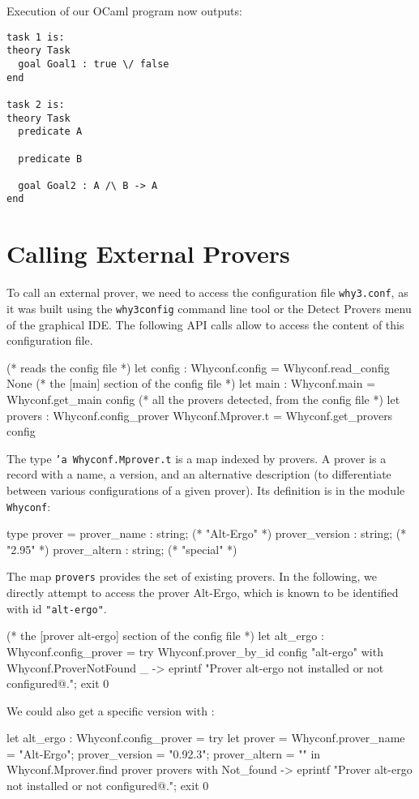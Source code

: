 Execution of our OCaml program now outputs:
\begin{verbatim}
task 1 is:
theory Task
  goal Goal1 : true \/ false
end

task 2 is:
theory Task
  predicate A

  predicate B

  goal Goal2 : A /\ B -> A
end
\end{verbatim}

\section{Calling External Provers}

To call an external prover, we need to access the \why configuration
file \texttt{why3.conf}, as it was built using the \texttt{why3config}
command line tool or the \textsf{Detect Provers} menu of the graphical
IDE. The following API calls allow to access the content of this
configuration file.
\begin{ocamlcode}
(* reads the config file *)
let config : Whyconf.config = Whyconf.read_config None
(* the [main] section of the config file *)
let main : Whyconf.main = Whyconf.get_main config
(* all the provers detected, from the config file *)
let provers : Whyconf.config_prover Whyconf.Mprover.t =
  Whyconf.get_provers config
\end{ocamlcode}
The type \texttt{'a Whyconf.Mprover.t} is a map indexed by provers. A
prover is a record with a name, a version, and an alternative description
(to differentiate between various configurations of a given prover). Its
definition is in the module \texttt{Whyconf}:
\begin{ocamlcode}
type prover =
    { prover_name : string; (* "Alt-Ergo" *)
      prover_version : string; (* "2.95" *)
      prover_altern : string; (* "special" *)
    }
\end{ocamlcode}
The map \texttt{provers} provides the set of existing provers.
In the following, we directly
attempt to access the prover Alt-Ergo, which is known to be identified
with id \texttt{"alt-ergo"}.
\begin{ocamlcode}
(* the [prover alt-ergo] section of the config file *)
let alt_ergo : Whyconf.config_prover =
  try
    Whyconf.prover_by_id config "alt-ergo"
  with Whyconf.ProverNotFound _ ->
    eprintf "Prover alt-ergo not installed or not configured@.";
    exit 0
\end{ocamlcode}
We could also get a specific version with :
\begin{ocamlcode}
let alt_ergo : Whyconf.config_prover =
  try
    let prover = {Whyconf.prover_name = "Alt-Ergo";
                  prover_version = "0.92.3";
                  prover_altern = ""} in
    Whyconf.Mprover.find prover provers
  with Not_found ->
    eprintf "Prover alt-ergo not installed or not configured@.";
    exit 0
\end{ocamlcode}

